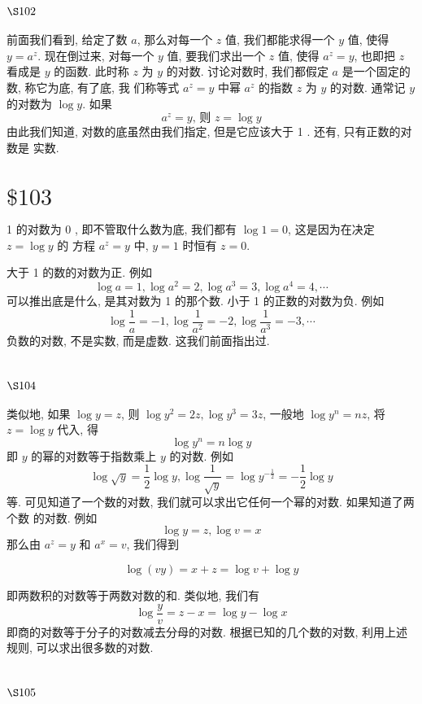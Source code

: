 \section{$\S 102$}

前面我们看到, 给定了数 $a$, 那么对每一个 $z$ 值, 我们都能求得一个 $y$ 值, 使得 $y=a^{z}$. 现在倒过来, 对每一个 $y$ 值, 要我们求出一个 $z$ 值, 使得 $a^{z}=y$, 也即把 $z$ 看成是 $y$ 的函数. 此时称 $z$ 为 $y$ 的对数. 讨论对数时, 我们都假定 $a$ 是一个固定的数, 称它为底, 有了底, 我 们称等式 $a^{z}=y$ 中幂 $a^{z}$ 的指数 $z$ 为 $y$ 的对数. 通常记 $y$ 的对数为 $\log y$. 如果
\[
a^{z}=y \text {, 则 } z=\log y
\]
由此我们知道, 对数的底虽然由我们指定, 但是它应该大于 1 . 还有, 只有正数的对数是 实数.

\section{$\$ 103$}

1 的对数为 0 , 即不管取什么数为底, 我们都有 $\log 1=0$, 这是因为在决定 $z=\log y$ 的 方程 $a^{z}=y$ 中, $y=1$ 时恒有 $z=0$.

大于 1 的数的对数为正. 例如
\[
\log a=1, \log a^{2}=2, \log a^{3}=3, \log a^{4}=4, \cdots
\]
可以推出底是什么, 是其对数为 1 的那个数. 小于 1 的正数的对数为负. 例如
\[
\log \frac{1}{a}=-1, \log \frac{1}{a^{2}}=-2, \log \frac{1}{a^{3}}=-3, \cdots
\]
负数的对数, 不是实数, 而是虚数. 这我们前面指出过.

\section{$\S 104$}

类似地, 如果 $\log y=z$, 则 $\log y^{2}=2 z, \log y^{3}=3 z$, 一般地 $\log y^{n}=n z$, 将 $z=\log y$ 代入, 得
\[
\log y^{n}=n \log y
\]
即 $y$ 的幂的对数等于指数乘上 $y$ 的对数. 例如
\[
\log \sqrt{y}=\frac{1}{2} \log y, \log \frac{1}{\sqrt{y}}=\log y^{-\frac{1}{2}}=-\frac{1}{2} \log y
\]
等. 可见知道了一个数的对数, 我们就可以求出它任何一个幂的对数. 如果知道了两个数 的对数. 例如
\[
\log y=z, \log v=x
\]
那么由 $a^{z}=y$ 和 $a^{x}=v$, 我们得到 

\[
\log (v y)=x+z=\log v+\log y
\]

即两数积的对数等于两数对数的和. 类似地, 我们有
\[
\log \frac{y}{v}=z-x=\log y-\log x
\]
即商的对数等于分子的对数减去分母的对数. 根据已知的几个数的对数, 利用上述规则, 可以求出很多数的对数.

\section{$\S 105$}

